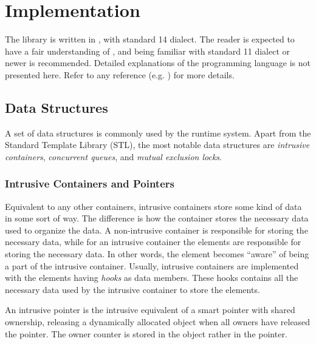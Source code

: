 

\chapter{Implementation}
\label{ch:implementation}


The library is written in \Cpp{}, with standard \Cpp{}14 dialect. The reader is expected to have a fair understanding of \Cpp{}, and being familiar with standard \Cpp{}11 dialect or newer is recommended. Detailed explanations of the \Cpp{} programming language is not presented here. Refer to any \Cpp{} reference (e.g. \citet{stroustrup2013c++}) for more details.


\section{Data Structures}
\label{sec:data_structures}


A set of data structures is commonly used by the runtime system. Apart from the \Cpp{} Standard Template Library (STL), the most notable data structures are \textit{intrusive containers}, \textit{concurrent queues}, and \textit{mutual exclusion locks}.


\subsection{Intrusive Containers and Pointers}


Equivalent to any other containers, intrusive containers store some kind of data in some sort of way. The difference is how the container stores the necessary data used to organize the data. A non\hyp{}intrusive container is responsible for storing the necessary data, while for an intrusive container the elements are responsible for storing the necessary data. In other words, the element becomes ``aware'' of being a part of the intrusive container. Usually, intrusive containers are implemented with the elements having \textit{hooks} as data members. These hooks contains all the necessary data used by the intrusive container to store the elements. 

An intrusive pointer is the intrusive equivalent of a smart pointer with shared ownership, releasing a dynamically allocated object when all owners have released the pointer. The owner counter is stored in the object rather in the pointer.

